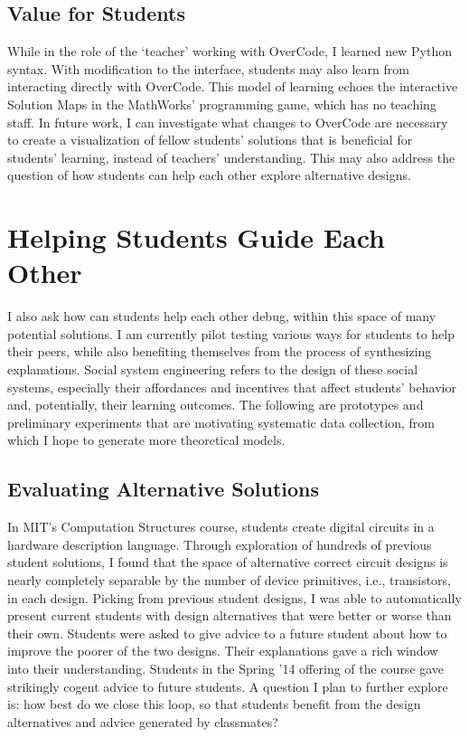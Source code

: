 \documentclass{sigchi}
\begin{document}
\subsection{Value for Students}
While in the role of the `teacher' working with OverCode, I learned new Python syntax. With modification to the interface, students may also learn from interacting directly with OverCode. This model of learning echoes the interactive Solution Maps in the MathWorks' programming game, which has no teaching staff. In future work, I can investigate what changes to OverCode are necessary to create a visualization of fellow students' solutions that is beneficial for students' learning, instead of teachers' understanding. This may also address the question of how students can help each other explore alternative designs.

\section{Helping Students Guide Each Other}
I also ask how can students help each other debug, within this space of many potential solutions. I am currently pilot testing various ways for students to help their peers, while also benefiting themselves from the process of synthesizing explanations. Social system engineering refers to the design of these social systems, especially their affordances and incentives that affect students' behavior and, potentially, their learning outcomes. The following are prototypes and preliminary experiments that are motivating systematic data collection, from which I hope to generate more theoretical models.

\subsection{Evaluating Alternative Solutions} In MIT's Computation Structures course, students create digital circuits in a hardware description language. Through exploration of hundreds of previous student solutions, I found that the space of alternative correct circuit designs is nearly completely separable by the number of device primitives, i.e., transistors, in each design. Picking from previous student designs, I was able to automatically present current students with design alternatives that were better or worse than their own. Students were asked to give advice to a future student about how to improve the poorer of the two designs. Their explanations gave a rich window into their understanding. Students in the Spring '14 offering of the course gave strikingly cogent advice to future students. A question I plan to further explore is: how best do we close this loop, so that students benefit from the design alternatives and advice generated by classmates? 
\end{document}

